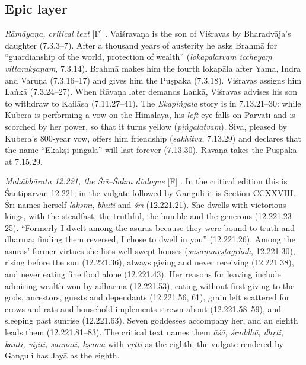 \documentclass[pdflatex,sn-basic]{sn-jnl}
\theoremstyle{thmstyleone}
\theoremstyle{thmstylethree}
\newcommand{\Fact}{\textsf{[F]}}
\begin{document}
\subsection{Epic layer}
\emph{R\=am\=aya\d na, critical text} \Fact{} \citep{gretil_ramayana}. Vai\'srava\d na is the son of Vi\'sravas by Bharadv\=aja's daughter (7.3.3--7). After a thousand years of austerity he asks Brahm\=a for ``guardianship of the world, protection of wealth'' (\emph{lokap\=alatvam iccheya\d m vittarak\d sa\d nam}, 7.3.14). Brahm\=a makes him the fourth lokap\=ala after Yama, Indra and Varu\d na (7.3.16--17) and gives him the Pu\d spaka (7.3.18). Vi\'sravas assigns him La\.nk\=a (7.3.24--27). When R\=ava\d na later demands La\.nk\=a, Vi\'sravas advises his son to withdraw to Kail\=asa (7.11.27--41). The \emph{Ekapi\.ngala} story is in 7.13.21--30: while Kubera is performing a vow on the Himalaya, his \emph{left} eye falls on P\=arvat\=\i{} and is scorched by her power, so that it turns yellow (\emph{pi\.ngalatvam}). \'Siva, pleased by Kubera's 800-year vow, offers him friendship (\emph{sakhitva}, 7.13.29) and declares that the name ``Ek\=ak\d si-pi\.ngala'' will last forever (7.13.30). R\=ava\d na takes the Pu\d spaka at 7.15.29.

\emph{Mah\=abh\=arata 12.221, the \'Sr\=\i{}--\'Sakra dialogue} \Fact{} \citep{gretil_mbh12,roy_santi2}. In the critical edition this is \'S\=antiparvan 12.221; in the vulgate followed by Ganguli it is Section CCXXVIII. \'Sr\=\i{} names herself \emph{lak\d sm\=\i}, \emph{bh\=uti} and \emph{\'sr\=\i} (12.221.21). She dwells with victorious kings, with the steadfast, the truthful, the humble and the generous (12.221.23--25). ``Formerly I dwelt among the asuras because they were bound to truth and dharma; finding them reversed, I chose to dwell in you'' (12.221.26). Among the asuras' former virtues she lists well-swept houses (\emph{susa\d mm\d r\d s\d tag\d rh\=a\d h}, 12.221.30), rising before the sun (12.221.36), always giving and never receiving (12.221.38), and never eating fine food alone (12.221.43). Her reasons for leaving include admiring wealth won by adharma (12.221.53), eating without first giving to the gods, ancestors, guests and dependants (12.221.56, 61), grain left scattered for crows and rats and household implements strewn about (12.221.58--59), and sleeping past sunrise (12.221.63). Seven goddesses accompany her, and an eighth leads them (12.221.81--83). The critical text names them \emph{\=a\'s\=a, \'sraddh\=a, dh\d rti, k\=anti, vijiti, sannati, k\d sam\=a} with \emph{v\d rtti} as the eighth; the vulgate rendered by Ganguli has Jay\=a as the eighth.
\end{document}
